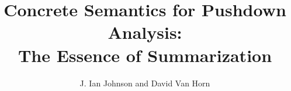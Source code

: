 \documentclass[article]{llncs}
\begin{document}
\title{Concrete Semantics for Pushdown Analysis:\\The Essence of Summarization}
\author{J. Ian Johnson and David Van Horn}


\maketitle

\begin{abstract}

\end{abstract}






\end{document}
